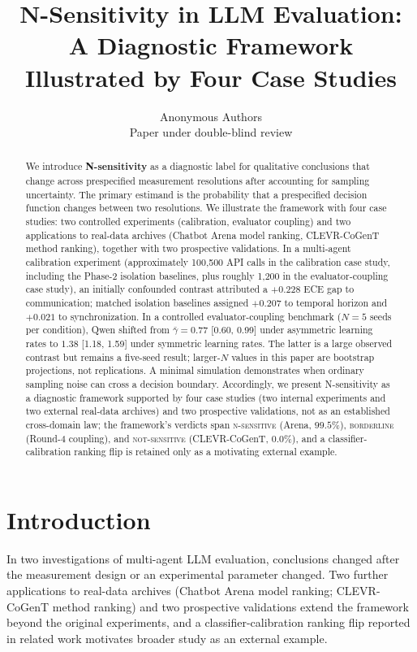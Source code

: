 \documentclass[11pt]{article}
\title{N-Sensitivity in LLM Evaluation: A Diagnostic Framework Illustrated by Four Case Studies}
\author{Anonymous Authors\\Paper under double-blind review}
\date{}
\begin{document}
\maketitle

\begin{abstract}
We introduce \textbf{N-sensitivity} as a diagnostic label for qualitative conclusions that change across prespecified measurement resolutions after accounting for sampling uncertainty. The primary estimand is the probability that a prespecified decision function changes between two resolutions. We illustrate the framework with four case studies: two controlled experiments (calibration, evaluator coupling) and two applications to real-data archives (Chatbot Arena model ranking, CLEVR-CoGenT method ranking), together with two prospective validations. In a multi-agent calibration experiment (approximately 100,500 API calls in the calibration case study, including the Phase-2 isolation baselines, plus roughly 1,200 in the evaluator-coupling case study), an initially confounded contrast attributed a $+0.228$ ECE gap to communication; matched isolation baselines assigned $+0.207$ to temporal horizon and $+0.021$ to synchronization. In a controlled evaluator-coupling benchmark ($N{=}5$ seeds per condition), Qwen shifted from $\bar{\gamma}{=}0.77$ [0.60, 0.99] under asymmetric learning rates to $1.38$ [1.18, 1.59] under symmetric learning rates. The latter is a large observed contrast but remains a five-seed result; larger-$N$ values in this paper are bootstrap projections, not replications. A minimal simulation demonstrates when ordinary sampling noise can cross a decision boundary. Accordingly, we present N-sensitivity as a diagnostic framework supported by four case studies (two internal experiments and two external real-data archives) and two prospective validations, not as an established cross-domain law; the framework's verdicts span \textsc{n-sensitive} (Arena, $99.5\%$), \textsc{borderline} (Round-4 coupling), and \textsc{not-sensitive} (CLEVR-CoGenT, $0.0\%$), and a classifier-calibration ranking flip is retained only as a motivating external example.
\end{abstract}

\section{Introduction}

In two investigations of multi-agent LLM evaluation, conclusions changed after the measurement design or an experimental parameter changed. Two further applications to real-data archives (Chatbot Arena model ranking; CLEVR-CoGenT method ranking) and two prospective validations extend the framework beyond the original experiments, and a classifier-calibration ranking flip reported in related work motivates broader study as an external example.
\end{document}
